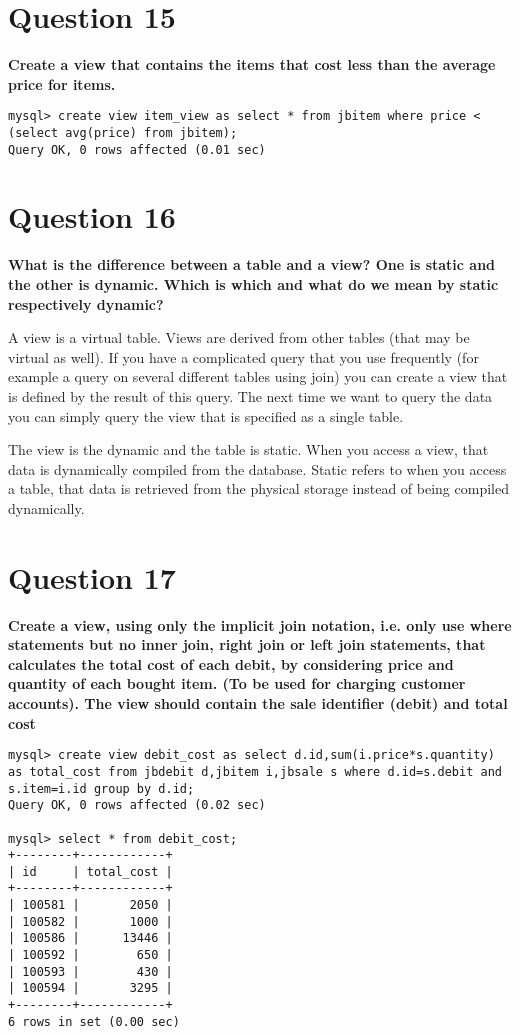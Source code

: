 \documentclass{article}
\begin{document}
\section*{Question 15}
\textbf{Create a view that contains the items that cost less than the average price for items.}

\begin{lstlisting}
mysql> create view item_view as select * from jbitem where price < (select avg(price) from jbitem);
Query OK, 0 rows affected (0.01 sec)
\end{lstlisting}

\section*{Question 16}
\textbf{What is the difference between a table and a view? One is static and the other is dynamic. Which is which and what do we mean by static respectively dynamic?}

A view is a virtual table. Views are derived from other tables (that may be virtual as well). If you have a complicated query that you use frequently (for example a query on several different tables using join) you can create a view that is defined by the result of this query. The next time we want to query the data you can simply query the view that is specified as a single table.

The view is the dynamic and the table is static. When you access a view, that data is dynamically compiled from the database. Static refers to when you access a table, that data is retrieved from the physical storage instead of being compiled dynamically.

\pagebreak

\section*{Question 17}
\textbf{Create a view, using only the implicit join notation, i.e. only use where statements but no inner join, right join or left join statements, that calculates the total cost of each debit, by considering price and quantity of each bought item. (To be used for charging customer accounts). The view should contain the sale identifier (debit) and total cost}

\begin{lstlisting}
mysql> create view debit_cost as select d.id,sum(i.price*s.quantity) as total_cost from jbdebit d,jbitem i,jbsale s where d.id=s.debit and s.item=i.id group by d.id;
Query OK, 0 rows affected (0.02 sec)

mysql> select * from debit_cost;
+--------+------------+
| id     | total_cost |
+--------+------------+
| 100581 |       2050 |
| 100582 |       1000 |
| 100586 |      13446 |
| 100592 |        650 |
| 100593 |        430 |
| 100594 |       3295 |
+--------+------------+
6 rows in set (0.00 sec)
\end{lstlisting}
\end{document}
